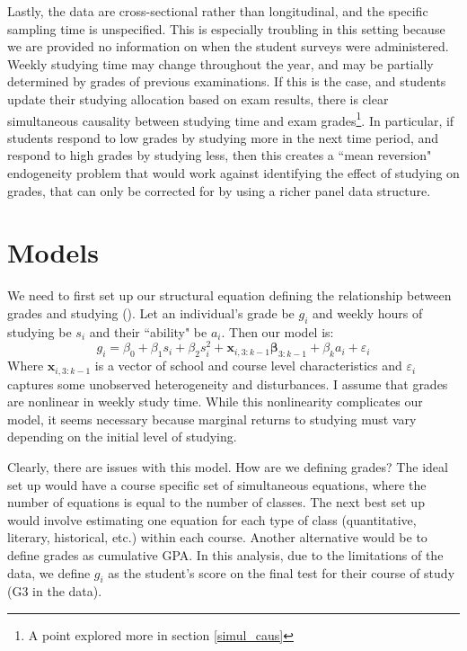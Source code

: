 \documentclass[12pt]{article}
\begin{document}
Lastly, the data are cross-sectional rather than longitudinal, and the specific sampling time is unspecified. This is especially troubling in this setting because we are provided no information on when the student surveys were administered. Weekly studying time may change throughout the year, and may be partially determined by grades of previous examinations. If this is the case, and students update their studying allocation based on exam results, there is clear simultaneous causality between studying time and exam grades\footnote{A point explored more in section \ref{simul_caus}}. In particular, if students respond to low grades by studying more in the next time period, and respond to high grades by studying less, then this creates a ``mean reversion" endogeneity problem that would work against identifying the effect of studying on grades, that can only be corrected for by using a richer panel data structure.


\newpage
\section{Models} \label{models}
We need to first set up our structural equation defining the relationship between grades and studying (\cite{CardKrueger}). Let an individual's grade be $g_i$ and weekly hours of studying be $s_i$ and their ``ability" be $a_i$. Then our model is:
$$
g_i = \beta_0 + \beta_1 s_i + \beta_2 s_i^2  + \bm{x}_{i,3:k-1}\bm{\beta}_{3:k-1} + \beta_k a_i + \varepsilon_i
$$
Where $\bm{x}_{i,3:k-1}$ is a vector of school and course level characteristics and $\varepsilon_i$ captures some unobserved heterogeneity and disturbances. I assume that grades are nonlinear in weekly study time. While this nonlinearity complicates our model, it seems necessary because marginal returns to studying must vary depending on the initial level of studying.

Clearly, there are issues with this model. How are we defining grades? The ideal set up would have a course specific set of simultaneous equations, where the number of equations is equal to the number of classes. The next best set up would involve estimating one equation for each type of class (quantitative, literary, historical, etc.) within each course. Another alternative would be to define grades as cumulative GPA. In this analysis, due to the limitations of the data, we define $g_i$ as the student's score on the final test for their course of study (G3 in the data).
\end{document}
